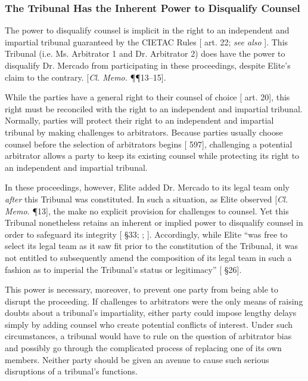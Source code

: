 \subsubsection{The Tribunal Has the Inherent Power to Disqualify Counsel}

The power to disqualify counsel is implicit in the right to an independent and impartial tribunal guaranteed by the CIETAC Rules [\cite{CIETAC Rules} art. 22; \textit{see also} \cite{Waincymer}]. This Tribunal (i.e. Ms. Arbitrator 1 and Dr. Arbitrator 2) does have the power to disqualify Dr. Mercado from participating in these proceedings, despite Elite's claim to the contrary. [\textit{Cl. Memo.} \P\P 13--15]. 

While the parties have a general right to their counsel of choice [\cite{CIETAC Rules} art. 20], this right must be reconciled with the right to an independent and impartial tribunal. Normally, parties will protect their right to an independent and impartial tribunal by making challenges to arbitrators. Because parties usually choose counsel before the selection of arbitrators begins [\cite{Waincymer} 597], challenging a potential arbitrator allows a party to keep its existing counsel while protecting its right to an independent and impartial tribunal.

In these proceedings, however, Elite added Dr. Mercado to its legal team only \textit{after} this Tribunal was constituted. In such a situation, as Elite observed [\textit{Cl. Memo.} \P 13], the  make no explicit provision for challenges to counsel. Yet this Tribunal nonetheless retains an inherent or implied power to disqualify counsel in order to safeguard its integrity [\cite{Hrvatska} \S 33; \cite{Brown}; \cite{Waincymer}]. Accordingly, while Elite ``was free to select its legal team as it saw fit prior to the constitution of the Tribunal, it was not entitled to subsequently amend the composition of its legal team in such a fashion as to imperial the Tribunal's status or legitimacy'' [\cite{Hrvatska} \S 26].

This power is necessary, moreover, to prevent one party from being able to disrupt the proceeding. If challenges to arbitrators were the only means of raising doubts about a tribunal's impartiality, either party could impose lengthy delays simply by adding counsel who create potential conflicts of interest. Under such circumstances, a tribunal would have to rule on the question of arbitrator bias and possibly go through the complicated process of replacing one of its own members. Neither party should be given an avenue to cause such serious disruptions of a tribunal's functions.

